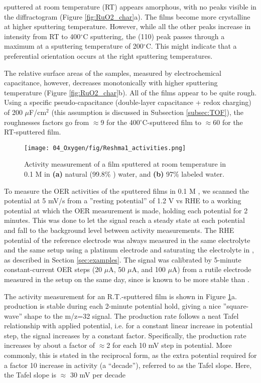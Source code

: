  sputtered at room temperature (RT) appears amorphous, with no peaks visible in the diffractogram (Figure \ref{fig:RuO2_char}a). The films become more crystalline at higher sputtering temperature. However, while all the other peaks increase in intensity from RT to 400$^\circ$C sputtering, the (110) peak passes through a maximum at a sputtering temperature of 200$^\circ$C. This might indicate that a preferential orientation occurs at the right sputtering temperatures.

The relative surface areas of the samples, measured by electrochemical capacitance, however, decreases monotonically with higher sputtering temperature (Figure \ref{fig:RuO2_char}b). All of the films appear to be quite rough. Using a specific pseudo-capacitance (double-layer capacitance + redox charging) of 200 $\mu$F/cm$^2$ (this assumption is discussed in Subsection \ref{subsec:TOF})\cite{Yoshida2013}, the roughnesses factors go from $\approx$9 for the 400$^\circ$C-sputtered film to $\approx$60 for the RT-sputtered film. %

\begin{figure}[h!]
	\texttt{[image: 04\_Oxygen/fig/Reshma1\_activities.png]}
	\caption{Activity measurement of a  film sputtered at room temperature in 0.1 M  in \textbf{(a)} natural (99.8\% ) water, and \textbf{(b)} 97\%  labeled water.}
	\label{fig:Reshma1_activities}
\end{figure}


To measure the OER activities of the sputtered films in 0.1 M , we scanned the potential at 5 mV/s from a ''resting potential'' of 1.2 V vs RHE to a working potential at which the OER measurement is made, holding each potential for 2 minutes. This was done to let the  signal reach a steady state at each potential and fall to the background level between activity measurements. The RHE potential of the reference electrode was always measured in the same electrolyte and the same setup using a platinum electrode and saturating the electrolyte in , as described in Section \ref{sec:examples}. The  signal was calibrated by 5-minute constant-current OER steps (20 $\mu$A, 50 $\mu$A, and 100 $\mu$A) from a rutile  electrode measured in the setup on the same day, since  is known to be more stable than \cite{Reier2017}.

The activity measurement for an R.T.-sputtered film is shown in Figure \ref{fig:Reshma1_activities}a.  production is stable during each 2-minute potential hold, giving a nice ''square-wave'' shape to the m/z=32 signal. The  production rate follows a neat Tafel relationship with applied potential, i.e. for a constant linear increase in potential step, the  signal increases by a constant factor. Specifically, the  production rate increases by about a factor of $\approx$2 for each 10 mV step in potential. More commonly, this is stated in the reciprocal form, as the extra potential required for a factor 10 increase in activity (a ``decade''), referred to as the Tafel slope. Here, the Tafel slope is $\approx$ 30 mV per decade

